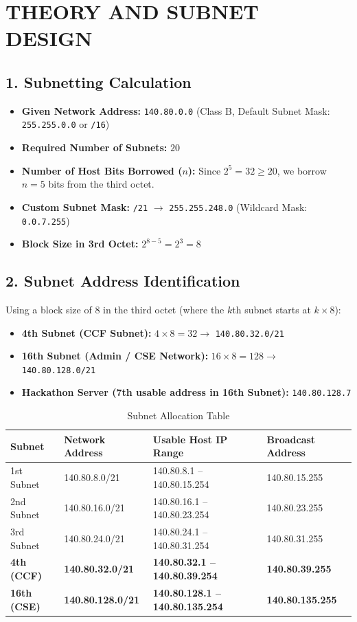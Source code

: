 \documentclass[12pt,a4paper]{article}
\begin{document}
	\section*{THEORY AND SUBNET DESIGN}
	\subsection*{1. Subnetting Calculation}
	\begin{itemize}
		\item \textbf{Given Network Address:} \texttt{140.80.0.0} (Class B, Default Subnet Mask: \texttt{255.255.0.0} or \texttt{/16})
		\item \textbf{Required Number of Subnets:} $20$
		\item \textbf{Number of Host Bits Borrowed ($n$):} Since $2^5 = 32 \ge 20$, we borrow $n = 5$ bits from the third octet.
		\item \textbf{Custom Subnet Mask:} \texttt{/21} $\rightarrow$ \texttt{255.255.248.0} (Wildcard Mask: \texttt{0.0.7.255})
		\item \textbf{Block Size in 3rd Octet:} $2^{8 - 5} = 2^3 = 8$
	\end{itemize}
	
	\subsection*{2. Subnet Address Identification}
Using a block size of $8$ in the third octet (where the $k$th subnet starts at $k \times 8$):
	\begin{itemize}
		\item \textbf{4th Subnet (CCF Subnet):} $4 \times 8 = 32 \rightarrow$ \texttt{140.80.32.0/21}
		\item \textbf{16th Subnet (Admin / CSE Network):} $16 \times 8 = 128 \rightarrow$ \texttt{140.80.128.0/21}
		\item \textbf{Hackathon Server (7th usable address in 16th Subnet):} \texttt{140.80.128.7}
	\end{itemize}
	
	\begin{table}[H]
		\centering
		\begin{tabular}{|l|l|l|l|}
			\hline
			\textbf{Subnet} & \textbf{Network Address} & \textbf{Usable Host IP Range} & \textbf{Broadcast Address} \\ \hline
			1st Subnet          & 140.80.8.0/21   & 140.80.8.1 -- 140.80.15.254     & 140.80.15.255  \\ \hline
			2nd Subnet          & 140.80.16.0/21  & 140.80.16.1 -- 140.80.23.254    & 140.80.23.255  \\ \hline
			3rd Subnet          & 140.80.24.0/21  & 140.80.24.1 -- 140.80.31.254    & 140.80.31.255  \\ \hline
			\textbf{4th (CCF)}  & \textbf{140.80.32.0/21}  & \textbf{140.80.32.1 -- 140.80.39.254}   & \textbf{140.80.39.255}  \\ \hline
			\textbf{16th (CSE)} & \textbf{140.80.128.0/21} & \textbf{140.80.128.1 -- 140.80.135.254} & \textbf{140.80.135.255} \\ \hline
		\end{tabular}
		\caption{Subnet Allocation Table}
	\end{table}
	
\end{document}
